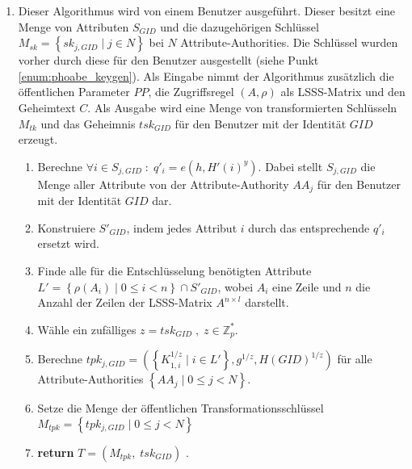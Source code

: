 \begin{enumerate}
	\item {} Dieser Al\-go\-rith\-mus wird von einem Benutzer ausgeführt.
			Dieser besitzt eine Menge von Attributen $S_{GID}$ und die dazugehörigen
			Schlüssel $M_{sk} = \left\{ sk_{j, GID} \;\vert\; j \in N \right\}$ bei
			$N$ Attribute-Authorities. Die Schlüssel wurden vorher durch diese für den
			Benutzer ausgestellt (siehe Punkt \ref{enum:phoabe_keygen}). Als Eingabe
			nimmt der Algorithmus zusätzlich die öffentlichen Parameter $PP$, die
			Zugriffsregel $\left(A, \rho\right)$ als LSSS-Matrix und den Geheimtext
			$C$. Als Ausgabe wird eine Menge von transformierten Schlüsseln $M_{tk}$
			und das Geheimnis $tsk_{GID}$ für den Benutzer mit der Identität $GID$ erzeugt.
		\begin{enumerate}
			\item Berechne $\forall i \in S_{j,GID} \;:\; q'_i = e(h, H'(i)^y)$. Dabei
				stellt $S_{j, GID}$ die Menge aller Attribute von der
				Attribute-Authority $AA_j$ für den Benutzer mit der Identität $GID$ dar.
			\item Konstruiere $S'_{GID}$, indem jedes Attribut $i$ durch das
				entsprechende $q'_i$ ersetzt wird.
			\item Finde alle für die Entschlüsselung benötigten Attribute \\ $L' =
				\left\{ \rho(A_i) \;\vert\; 0 \leq i < n \right\} \cap S'_{GID}$, wobei
				$A_i$ eine Zeile und $n$ die Anzahl der Zeilen der LSSS-Matrix
				$A^{n \times l}$ darstellt.
			\item Wähle ein zufälliges $z = tsk_{GID} \;,\; z \in \mathbb{Z}^*_p$.
			\item Berechne $tpk_{j,GID} = \left( \left\{K_{1,i}^{1/z} \;\vert\; i \in L'
				\right\}, g^{1/z}, H(GID)^{1/z} \right)$ für alle Attribute-Authorities
				$\left\{ AA_j \;\vert\; 0 \leq j < N \right\}$.
			\item Setze die Menge der öffentlichen Transformationsschlüssel $M_{tpk} =
				\left\{tpk_{j, GID} \;\vert\; 0 \leq j < N\right\}$
			\item \textbf{return} $T = \left(M_{tpk},\; tsk_{GID}\right)$ .
		\end{enumerate}


\end{enumerate}
